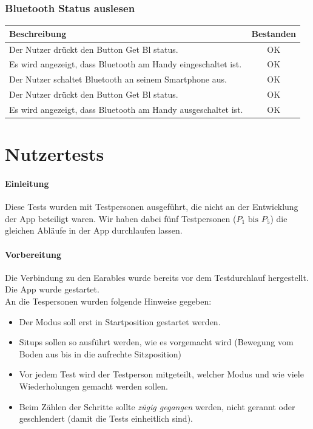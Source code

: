 \documentclass[a4paper,12pt]{article}
\newcommand{\testok}[0]{
	\cellcolor{green!25} OK
}
\begin{document}
\subsubsection{Bluetooth Status auslesen}
\begin{tabular}{ | p{12cm} | c| }
	\hline
	\textbf{Beschreibung} & \textbf{Bestanden}\\
	\hline
	Der Nutzer drückt den Button \glqq{}Get Bl status\grqq{}. & \testok \\
	\hline
	Es wird angezeigt, dass Bluetooth am Handy eingeschaltet ist. & \testok \\
	\hline
	Der Nutzer schaltet Bluetooth an seinem Smartphone aus. & \testok \\
	\hline
	Der Nutzer drückt den Button \glqq{}Get Bl status\grqq{}. & \testok \\
	\hline
	Es wird angezeigt, dass Bluetooth am Handy ausgeschaltet ist. & \testok \\
	\hline
\end{tabular}

\section{Nutzertests}
\paragraph{Einleitung}
Diese Tests wurden mit Testpersonen ausgeführt, die nicht an der Entwicklung der App beteiligt waren. Wir haben dabei fünf Testpersonen ($P_1 \text{ bis } P_5$) die gleichen Abläufe in der App durchlaufen lassen.
\paragraph{Vorbereitung}
Die Verbindung zu den Earables wurde bereits vor dem Testdurchlauf hergestellt.
Die App wurde gestartet.\\
An die Tespersonen wurden folgende Hinweise gegeben:
\begin{itemize}
	\item Der Modus soll erst in Startposition gestartet werden.
	\item Situps sollen so ausführt werden, wie es vorgemacht wird (Bewegung vom Boden aus bis in die aufrechte Sitzposition)
	\item Vor jedem Test wird der Testperson mitgeteilt, welcher Modus und wie viele Wiederholungen gemacht werden sollen.
	\item Beim Zählen der Schritte sollte \textit{zügig gegangen} werden, nicht gerannt oder geschlendert (damit die Tests einheitlich sind).
\end{itemize}
\end{document}
